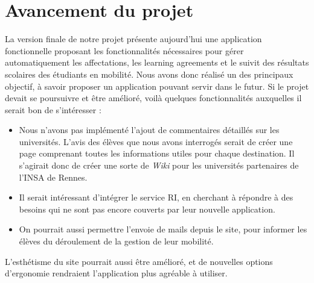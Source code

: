 \chapter{Avancement du projet}

La version finale de notre projet présente aujourd'hui une application fonctionnelle proposant les fonctionnalités nécessaires pour gérer automatiquement les affectations, les learning agreements et le suivit des résultats scolaires des étudiants en mobilité.
Nous avons donc réalisé un des principaux objectif, à savoir proposer un application pouvant servir dans le futur.
\smallbreak
Si le projet devait se poursuivre et être amélioré, voilà quelques fonctionnalités auxquelles il serait bon de s'intéresser :
\begin{itemize}
	\item Nous n'avons pas implémenté l'ajout de commentaires détaillés sur les universités. L'avis des élèves que nous avons interrogés serait de créer une page comprenant toutes les informations utiles pour chaque destination. Il s'agirait donc de créer une sorte de \textit{Wiki} pour les universités partenaires de l'INSA de Rennes.
	\item Il serait intéressant d'intégrer le service RI, en cherchant à répondre à des besoins qui ne sont pas encore couverts par leur nouvelle application.
	\item On pourrait aussi permettre l'envoie de mails depuis le site, pour informer les élèves du déroulement de la gestion de leur mobilité.
\end{itemize}
\smallbreak
L'esthétisme du site pourrait aussi être amélioré, et de nouvelles options d'ergonomie rendraient l'application plus agréable à utiliser.
